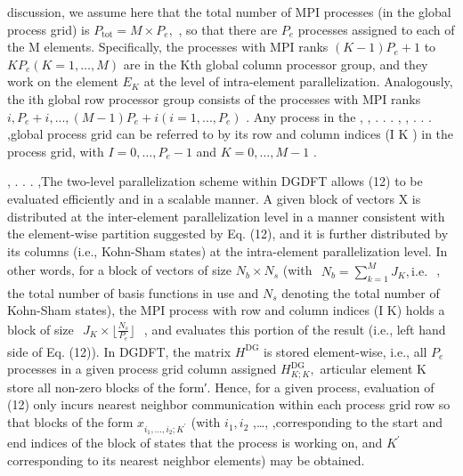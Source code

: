 \documentclass[
  10
]{article}
\begin{document}
discussion, we assume here that the total number of MPI processes (in
the global process grid) is
\(P _ { \mathrm { t o t } } = M \times P _ { e } ,\) , so that there are
\(P _ { e }\) processes assigned to each of the M elements.
Specifically, the processes with MPI ranks \(( K - 1 ) P _ { e } + 1\)
to \(K P _ { e } \left( K = 1 , \ldots , M \right)\) are in the Kth
global column processor group, and they work on the element
\(E _ { K }\) at the level of intra-element parallelization.
Analogously, the ith global row processor group consists of the
processes with MPI ranks
\(i , P _ { e } + i , . . . , ( M - 1 ) P _ { e } + i ( i = 1 , . . . , P _ { e } )\)
. Any process in the , , . . . , , . . . ,global process grid can be
referred to by its row and column indices (I K ) in the process grid,
with \(I = 0 , \ldots , P _ { e } - 1\) and \(K = 0 , \ldots , M - 1\) .

, . . . ,The two-level parallelization scheme within DGDFT allows (12)
to be evaluated efficiently and in a scalable manner. A given block of
vectors X is distributed at the inter-element parallelization level in a
manner consistent with the element-wise partition suggested by Eq. (12),
and it is further distributed by its columns (i.e., Kohn-Sham states) at
the intra-element parallelization level. In other words, for a block of
vectors of size \(N _ { b } \times N _ { s }\) (with
\(\begin{array} { r } { N _ { b } = \sum _ { k = 1 } ^ { M } J _ { K } , \mathrm { i . e . } } \end{array}\)
, the total number of basis functions in use and \(N _ { s }\) denoting
the total number of Kohn-Sham states), the MPI process with row and
column indices (I K) holds a block of size
\(\begin{array} { r } { J _ { K } \times \lfloor \frac { N _ { s } } { P _ { e } } \rfloor } \end{array}\)
, and evaluates this portion of the result (i.e., left hand side of Eq.
(12)). In DGDFT, the matrix \(H ^ { \mathrm { D G } }\) is stored
element-wise, i.e., all \(P _ { e }\) processes in a given process grid
column assigned \(H _ { K ; K } ^ { \mathrm { { D G } } } ,\) articular
element K store all non-zero blocks of the form′. Hence, for a given
process, evaluation of (12) only incurs nearest neighbor communication
within each process grid row so that blocks of the form
\(x _ { i _ { 1 } , \dots , i _ { 2 } ; K ^ { \prime } }\) (with
\(i _ { 1 } , i _ { 2 }\) ,\ldots, ,corresponding to the start and end
indices of the block of states that the process is working on, and
\(K ^ { \prime }\) corresponding to its nearest neighbor elements) may
be obtained.
\end{document}
